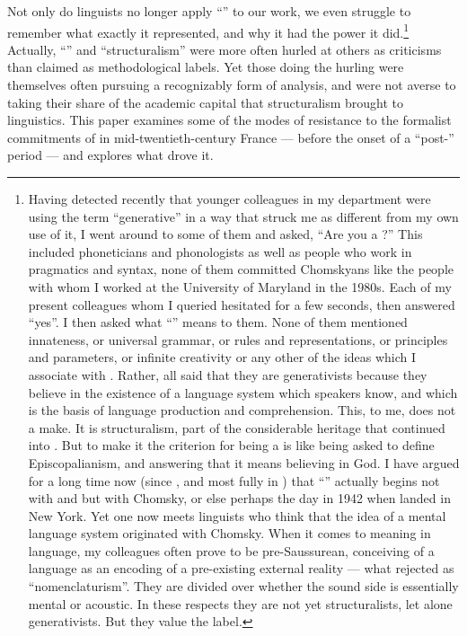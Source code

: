\documentclass[output=paper]{langscibook}
\begin{document}
Not only do linguists no longer apply ``'' to our work, we even struggle to remember what exactly it represented, and why it had the power it did.\footnote{Having detected recently that younger colleagues in my department were using the term ``generative'' in a way that struck me as different from my own use of it, I went around to some of them and asked, ``Are you a ?'' This included phoneticians and phonologists as well as people who work in pragmatics and syntax, none of them committed Chomskyans like the people with whom I worked at the University of Maryland in the 1980s. Each of my present colleagues whom I queried hesitated for a few seconds, then answered ``yes''. I then asked what ``'' means to them. None of them mentioned innateness, or universal grammar, or rules and representations, or principles and parameters, or infinite creativity or any other of the ideas which I associate with . Rather, all said that they are generativists because they believe in the existence of a language system which speakers know, and which is the basis of language production and comprehension. This, to me, does not a  make. It is structuralism, part of the considerable  heritage that continued into . But to make it the criterion for being a  is like being asked to define Episcopalianism, and answering that it means believing in God. I have argued for a long time now (since \citealt{Joseph1999}, and most fully in \citealt{Joseph2002whitney}) that ``'' actually begins not with {\Bloomfield} and {\Sapir} but with Chomsky, or else perhaps the day in 1942 when {\Jakobson} landed in New York. Yet one now meets linguists who think that the idea of a mental language system originated with Chomsky. When it comes to meaning in language, my colleagues often prove to be pre-Saussurean, conceiving of a language as an encoding of a pre-existing external reality — what {\Saussure} rejected as ``nomenclaturism''. They are divided over whether the sound side is essentially mental or acoustic. In these respects they are not yet structuralists, let alone generativists. But they value the label.} Actually, ``'' and ``structuralism'' were more often hurled at others as criticisms than claimed as methodological labels. Yet those doing the hurling were themselves often pursuing a recognizably  form of analysis, and were not averse to taking their share of the academic capital that structuralism brought to linguistics. This paper examines some of the modes of resistance to the formalist commitments of  in mid-twentieth-century France — before the onset of a ``post-'' period — and explores what drove it.
\end{document}

